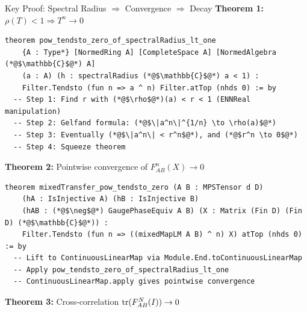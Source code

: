 \documentclass[aspectratio=169,10pt]{beamer}
\begin{document}
\begin{frame}[fragile]{Key Proof: Spectral Radius $\Rightarrow$ Convergence $\Rightarrow$ Decay}
\vspace{-0.5em}
\textbf{Theorem 1:} $\rho(T) < 1 \Rightarrow T^n \to 0$ 
\begin{lstlisting}[basicstyle=\ttfamily\fontsize{5}{6.5}\selectfont\color{white}]
theorem pow_tendsto_zero_of_spectralRadius_lt_one
    {A : Type*} [NormedRing A] [CompleteSpace A] [NormedAlgebra (*@$\mathbb{C}$@*) A]
    (a : A) (h : spectralRadius (*@$\mathbb{C}$@*) a < 1) :
    Filter.Tendsto (fun n => a ^ n) Filter.atTop (nhds 0) := by
  -- Step 1: Find r with (*@$\rho$@*)(a) < r < 1 (ENNReal manipulation)
  -- Step 2: Gelfand formula: (*@$\|a^n\|^{1/n} \to \rho(a)$@*)
  -- Step 3: Eventually (*@$\|a^n\| < r^n$@*), and (*@$r^n \to 0$@*)
  -- Step 4: Squeeze theorem
\end{lstlisting}

\vspace{0.2em}
\textbf{Theorem 2:} Pointwise convergence of $F_{AB}^n(X) \to 0$
\begin{lstlisting}[basicstyle=\ttfamily\fontsize{5}{6.5}\selectfont\color{white}]
theorem mixedTransfer_pow_tendsto_zero (A B : MPSTensor d D)
    (hA : IsInjective A) (hB : IsInjective B)
    (hAB : (*@$\neg$@*) GaugePhaseEquiv A B) (X : Matrix (Fin D) (Fin D) (*@$\mathbb{C}$@*)) :
    Filter.Tendsto (fun n => ((mixedMapLM A B) ^ n) X) atTop (nhds 0) := by
  -- Lift to ContinuousLinearMap via Module.End.toContinuousLinearMap
  -- Apply pow_tendsto_zero_of_spectralRadius_lt_one
  -- ContinuousLinearMap.apply gives pointwise convergence
\end{lstlisting}

\vspace{0.2em}
\textbf{Theorem 3:} Cross-correlation $\mathrm{tr}(F_{AB}^N(I)) \to 0$ 
\end{frame}
\end{document}
